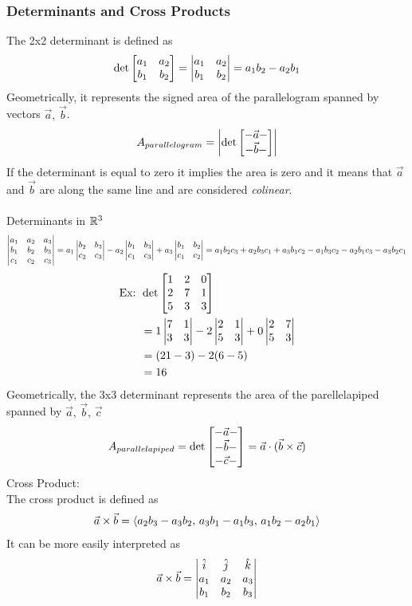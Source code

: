 \documentclass[11pt, fleqn]{article}
\begin{document}
\subsubsection{Determinants and Cross Products}
The 2x2 determinant is defined as
$$\det\matrixx{a_1 & a_2\\ b_1 & b_2}=\detmatrix{a_1 & a_2\\ b_1 & b_2}=a_1b_2-a_2b_1$$
Geometrically, it represents the signed area of the parallelogram spanned by vectors $\vec{a},\,\vec{b}$.
$$A_{parallelogram}=\left|\det\matrixx{-\vec{a}-\\-\vec{b}-}\right|$$
If the determinant is equal to zero it implies the area is zero and it means that $\vec{a}$ and $\vec{b}$ are along the same line and are considered \textit{colinear}.\\
\\
Determinants in $\mathbb{R}^3$
$$\left|\begin{matrix} a_1 & a_2 & a_3\\b_1 & b_2 & b_3\\c_1 & c_2 & c_3 \end{matrix}\right|=a_1\left|\begin{matrix} b_2 & b_3\\c_2 & c_3 \end{matrix}\right|-a_2\left|\begin{matrix} b_1 & b_3\\c_1 & c_3 \end{matrix}\right|+a_3\left|\begin{matrix} b_1 & b_2\\c_1 & c_2 \end{matrix}\right|=a_1b_2c_3+a_2b_3c_1+a_3b_1c_2-a_1b_3c_2-a_2b_1c_3-a_3b_2c_1$$
\begin{align*}
    \text{Ex: }&\det\matrixx{1 & 2& 0\\2& 7 & 1\\ 5& 3& 3}\\
    &=1\detmatrix{7 & 1\\ 3 & 3}-2\detmatrix{ 2 &1\\ 5&3}+0\detmatrix{2 & 7\\5 & 3}\\
    &=(21-3)-2(6-5)\\
    &=16
\end{align*}
Geometrically, the 3x3 determinant represents the area of the parellelapiped spanned by $\vec{a},\,\vec{b},\,\vec{c}$
$$A_{parallelapiped}=\det\matrixx{-\vec{a}-\\-\vec{b}-\\-\vec{c}-}=\vec{a}\cdot(\vec{b}\times\vec{c})$$
Cross Product:\\
The cross product is defined as
$$\vec{a}\times\vec{b}=\left\langle a_2b_3-a_3b_2,\,a_3b_1-a_1b_3,\,a_1b_2-a_2b_1 \right\rangle$$
It can be more easily interpreted as
$$\vec{a}\times\vec{b}=\left|\begin{matrix} \hat{i} & \hat{j} & \hat{k}\\a_1 & a_2 & a_3\\b_1 & b_2 & b_3 \end{matrix}\right|$$
\end{document}
